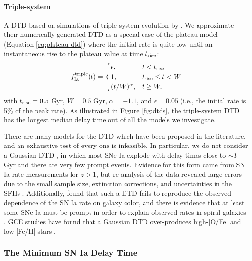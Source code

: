 \documentclass[twocolumn,twocolappendix]{aastex631}
\begin{document}
\paragraph{Triple-system} A DTD based on simulations of triple-system evolution by \citet{Rajamuthukumar2023-TripleEvolution}. We approximate their numerically-generated DTD as a special case of the plateau model (Equation \ref{eq:plateau-dtd}) where the initial rate is quite low until an instantaneous rise to the plateau value at time $t_{\rm rise}$:
\begin{equation}
    f_{\rm Ia}^{\rm triple}(t) =
    \begin{cases}
        \epsilon, & t < t_{\rm rise} \\
        1, & t_{\rm rise} \leq t < W \\
        (t / W) ^ \alpha, & t \geq W,
    \end{cases}
    \label{eq:triple-dtd}
\end{equation}
with $t_{\rm rise}=0.5$ Gyr, $W=0.5$ Gyr, $\alpha=-1.1$, and $\epsilon=0.05$ (i.e., the initial rate is 5\% of the peak rate). As illustrated in Figure \ref{fig:dtds}, the triple-system DTD has the longest median delay time out of all the models we investigate.

There are many models for the DTD which have been proposed in the literature, and an exhaustive test of every one is infeasible. In particular, we do not consider a Gaussian DTD \citep[e.g.,][]{Strolger2004-SNIaProgenitors}, in which most SNe Ia explode with delay times close to $\sim 3$ Gyr and there are very few prompt events. Evidence for this form came from SN Ia rate measurements for $z>1$, but re-analysis of the data revealed large errors due to the small sample size, extinction corrections, and uncertainties in the SFHs \citep[e.g.,][]{Forster2006-SNIaConstraints,Greggio2008-CosmicMix}. Additionally, \citet{Mannucci2006-TwoPopulations} found that such a DTD fails to reproduce the observed dependence of the SN Ia rate on galaxy color, and there is evidence that at least some SNe Ia must be prompt in order to explain observed rates in spiral galaxies \citep[e.g.,][]{Mannucci2005-SNRate,ScannapiecoBildsten2005-SNIaRate}. GCE studies have found that a Gaussian DTD over-produces high-[O/Fe] and low-[Fe/H] stars \citep{Matteucci2009-DTDModels,Palicio2023-AnalyticDTD}.

\subsubsection{The Minimum SN Ia Delay Time}
\label{sec:minimum-delay}
\end{document}
